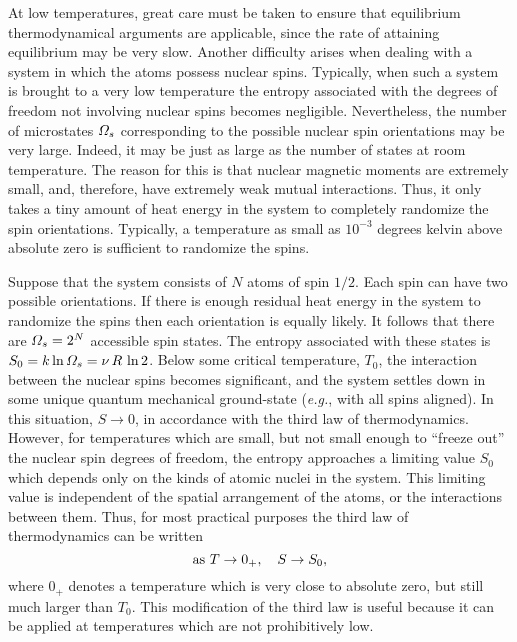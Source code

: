 At low temperatures, great care must be taken to ensure that equilibrium 
thermodynamical arguments are applicable, since the rate of attaining equilibrium may
be very slow. Another difficulty arises when dealing with a system in which the
atoms possess nuclear spins. Typically, when such a system is brought to a very
low temperature the entropy associated with the degrees of freedom not
involving nuclear spins becomes negligible. Nevertheless, the number of microstates
${\mit\Omega}_s$ corresponding to the possible nuclear spin orientations may be very
large. Indeed, it may be just as large as the number of states at 
room  temperature. The reason for this is that nuclear magnetic moments are extremely small,
and, therefore, have extremely weak mutual interactions. Thus, 
it only takes a tiny amount
of heat energy in the system to completely randomize the spin orientations. 
Typically, a temperature as small as $10^{-3}$ degrees kelvin above absolute zero
is sufficient to randomize the spins. 

Suppose that the  system consists of $N$ atoms
of spin $1/2$. Each spin can have two possible orientations. If there is enough
residual heat energy in the system to randomize the spins then each orientation
is equally likely. It follows that there are ${\mit\Omega}_s = 2^N$ accessible spin
states. The entropy associated with these states is $S_0 = k\ln{\mit\Omega}_s =
\nu\, R\, \ln 2$. Below some critical temperature, $T_0$, the interaction between the
nuclear spins  becomes significant, and the system  settles down in
some unique  quantum mechanical ground-state ({\em e.g.}, with all spins aligned).
In this situation, $S\rightarrow 0$,
 in accordance with the third law of thermodynamics. However, for temperatures
which are small, but not small enough to ``freeze out'' the nuclear spin degrees
of freedom, the entropy approaches a limiting value $S_0$ which depends only
on the kinds of atomic nuclei in the system. This limiting value is independent
of the spatial arrangement of the atoms, or the interactions between them.
Thus, for most practical purposes the third law of thermodynamics can be written
\begin{equation}
{\rm as~} T\rightarrow 0_{+},~~~S\rightarrow S_0,
\end{equation}
where $0_{+}$ denotes a temperature which is very close to absolute zero, but
still much larger than $T_0$. This modification  of the third law is
useful because it can be applied at temperatures which are not prohibitively low.

